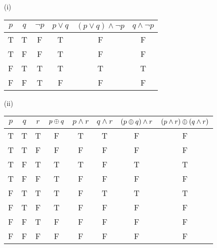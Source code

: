 \documentclass{report}
\begin{document}
\sol (i)
\begin{center}
	\begin{tabular}{|cc||c||c||cc|}
		\hline
		$p$	&$q$ &$\lnot p$ &$p\lor q$ &$(p\lor q)\land \lnot p$ &$q\land\lnot p$ \\ \hline
		T & T & F & T & F & F \\ 
		T & F & F & T & F & F \\ 
		F & T & T & T & T & T \\ 
		F & F & T & F & F & F \\ \hline
	\end{tabular}
\end{center}

\sol (ii)
\begin{center}
	\begin{tabular}{|ccc||c||cc||cc|}
		\hline
		$p$ &$q$	&$r$	&$p\oplus q$ &$p\land r$ &$q\land r$ &$(p\oplus q)\land r$ &$(p\land r)\oplus(q\land r)$ \\ \hline
		T & T & T & F & T & T & F & F \\
		T & T & F & F & F & F & F & F \\
		T & F & T & T & T & F & T & T \\
		T & F & F & T & F & F & F & F \\
		F & T & T & T & F & T & T & T \\
		F & T & F & T & F & F & F & F \\
		F & F & T & F & F & F & F & F \\
		F & F & F & F & F & F & F & F \\ \hline
	\end{tabular}	
\end{center}
\end{document}

